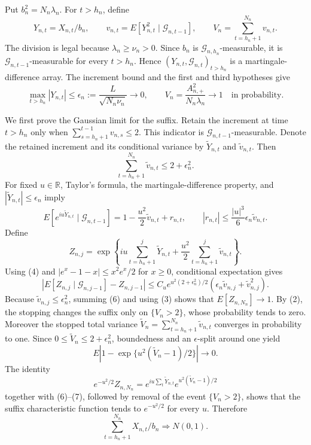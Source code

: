 Put \(b_n^2=N_n\lambda_n\).  For \(t>h_n\), define
\[
 Y_{n,t}=X_{n,t}/b_n,\qquad
 v_{n,t}=E[Y_{n,t}^2\mid\mathcal G_{n,t-1}],\qquad
 V_n=\sum_{t=h_n+1}^{N_n}v_{n,t}.
\tag{1}
\]
The division is legal because \(\lambda_n\ge\nu_n>0\).  Since \(b_n\) is
\(\mathcal G_{n,h_n}\)-measurable, it is \(\mathcal G_{n,t-1}\)-measurable for
every \(t>h_n\).  Hence \((Y_{n,t},\mathcal G_{n,t})_{t>h_n}\) is a
martingale-difference array.  The increment bound and the first and third
hypotheses give
\[
 \max_{t>h_n}|Y_{n,t}|\le
 \epsilon_n:=\frac{L}{\sqrt{N_n\nu_n}}\longrightarrow0,
 \qquad
 V_n=\frac{A_{n,+}^2}{N_n\lambda_n}\longrightarrow1
 \quad\text{in probability}.
\tag{2}
\]

We first prove the Gaussian limit for the suffix.  Retain the increment at
time \(t>h_n\) only when
\(\sum_{s=h_n+1}^{t-1}v_{n,s}\le2\).  This indicator is
\(\mathcal G_{n,t-1}\)-measurable.  Denote the retained increment and its
conditional variance by \(\widetilde Y_{n,t}\) and \(\widetilde v_{n,t}\).
Then
\[
 \sum_{t=h_n+1}^{N_n}\widetilde v_{n,t}\le2+\epsilon_n^2.
\tag{3}
\]
For fixed \(u\in\mathbb R\), Taylor's formula, the martingale-difference
property, and \(|\widetilde Y_{n,t}|\le\epsilon_n\) imply
\[
 E[e^{iu\widetilde Y_{n,t}}\mid\mathcal G_{n,t-1}]
 =1-\frac{u^2}{2}\widetilde v_{n,t}+r_{n,t},
 \qquad
 |r_{n,t}|\le\frac{|u|^3}{6}\epsilon_n\widetilde v_{n,t}.
\tag{4}
\]
Define
\[
 Z_{n,j}=\exp\!\left\{iu\sum_{t=h_n+1}^j\widetilde Y_{n,t}
 +\frac{u^2}{2}\sum_{t=h_n+1}^j\widetilde v_{n,t}\right\}.
\tag{5}
\]
Using (4) and
\(|e^x-1-x|\le x^2e^x/2\) for \(x\ge0\), conditional expectation gives
\[
 \left|E[Z_{n,j}\mid\mathcal G_{n,j-1}]-Z_{n,j-1}\right|
 \le C_u e^{u^2(2+\epsilon_n^2)/2}
 \left(\epsilon_n\widetilde v_{n,j}+\widetilde v_{n,j}^2\right).
\tag{6}
\]
Because \(\widetilde v_{n,j}\le\epsilon_n^2\), summing (6) and using (3)
shows that \(E[Z_{n,N_n}]\to1\).  By (2), the stopping changes the suffix
only on \(\{V_n>2\}\), whose probability tends to zero.  Moreover the stopped
total variance
\(\widetilde V_n=\sum_{t=h_n+1}^{N_n}\widetilde v_{n,t}\) converges in
probability to one.  Since \(0\le\widetilde V_n\le2+\epsilon_n^2\), boundedness
and an \(\epsilon\)-split around one yield
\[
 E\left|1-\exp\{u^2(\widetilde V_n-1)/2\}\right|\longrightarrow0.
\tag{7}
\]
The identity
\[
 e^{-u^2/2}Z_{n,N_n}
 =e^{iu\sum_t\widetilde Y_{n,t}}
 e^{u^2(\widetilde V_n-1)/2}
\]
together with (6)--(7), followed by removal of the event \(\{V_n>2\}\),
shows that the suffix characteristic function tends to \(e^{-u^2/2}\) for
every \(u\).  Therefore
\[
 \sum_{t=h_n+1}^{N_n}X_{n,t}/b_n\Rightarrow N(0,1).
\tag{8}
\]

